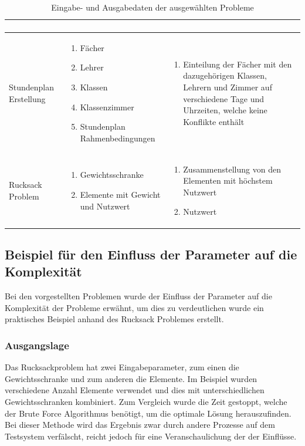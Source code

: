 \begin{table}[ht]
\begin{tabular}{ p{3cm} | p{5.4cm} | p{5.4cm} }
\begin{enumerate}
							   \end{enumerate}	\\ \hline
	Stundenplan Erstellung			& \begin{enumerate}
								\item Fächer
								\item Lehrer
								\item Klassen
								\item Klassenzimmer
								\item Stundenplan Rahmenbedingungen
							   \end{enumerate}				
							&  \begin{enumerate}
								\item  Einteilung der Fächer mit den dazugehörigen Klassen, Lehrern und Zimmer auf verschiedene Tage und Uhrzeiten, welche keine 
									Konflikte enthält
							   \end{enumerate}	\\ \hline
	Rucksack Problem				& \begin{enumerate}
								\item Gewichtsschranke
								\item Elemente mit Gewicht und Nutzwert
							   \end{enumerate}				
							&  \begin{enumerate}
								\item Zusammenstellung von den Elementen mit höchstem Nutzwert
								\item Nutzwert
							   \end{enumerate}	\\ \hline
  \end{tabular}
   \caption{Eingabe- und Ausgabedaten der ausgewählten Probleme}\label{table:input_output}
\end{table}

\newpage
\subsection{Beispiel für den Einfluss der Parameter auf die Komplexität \resultAssignment{[R1a]}}\label{example_complexity_knapsack}
Bei den vorgestellten Problemen wurde der Einfluss der Parameter auf die Komplexität der Probleme erwähnt, um dies zu verdeutlichen wurde ein praktisches Beispiel anhand des Rucksack 
Problemes erstellt.

\subsubsection{Ausgangslage}
Das Rucksackproblem hat zwei Eingabeparameter, zum einen die Gewichtsschranke und zum anderen die Elemente. Im Beispiel wurden verschiedene Anzahl Elemente verwendet und dies mit 
unterschiedlichen Gewichtsschranken kombiniert. Zum Vergleich wurde die Zeit gestoppt, welche der Brute Force Algorithmus benötigt, um die optimale Lösung herauszufinden. Bei dieser 
Methode wird das Ergebnis zwar durch andere Prozesse auf dem Testsystem verfälscht, reicht jedoch für eine Veranschaulichung der der Einflüsse.

